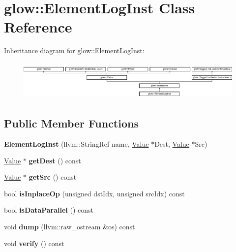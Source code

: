 \hypertarget{classglow_1_1_element_log_inst}{}\section{glow\+:\+:Element\+Log\+Inst Class Reference}
\label{classglow_1_1_element_log_inst}
Inheritance diagram for glow\+:\+:Element\+Log\+Inst\+:\begin{figure}[H]
\begin{center}
\leavevmode
\includegraphics[height=1.991111cm]{classglow_1_1_element_log_inst}
\end{center}
\end{figure}
\subsection*{Public Member Functions}
\begin{DoxyCompactItemize}
\item 
\mbox{\label{classglow_1_1_element_log_inst_a629b726abab98d5cee15cfb6927a898f}} 
{\bfseries Element\+Log\+Inst} (llvm\+::\+String\+Ref name, \hyperlink{classglow_1_1_value}{Value} $\ast$Dest, \hyperlink{classglow_1_1_value}{Value} $\ast$Src)
\item 
\mbox{\label{classglow_1_1_element_log_inst_a936528bc88434fdc9d9c92a4dd6e8d34}} 
\hyperlink{classglow_1_1_value}{Value} $\ast$ {\bfseries get\+Dest} () const
\item 
\mbox{\label{classglow_1_1_element_log_inst_a36c2c3371694006e2b24e709d9a6548b}} 
\hyperlink{classglow_1_1_value}{Value} $\ast$ {\bfseries get\+Src} () const
\item 
\mbox{\label{classglow_1_1_element_log_inst_acf62b48eb8394da1d902eaae96f21c01}} 
bool {\bfseries is\+Inplace\+Op} (unsigned dst\+Idx, unsigned src\+Idx) const
\item 
\mbox{\label{classglow_1_1_element_log_inst_ab400fee047625ff2d5e93e8a9ada9beb}} 
bool {\bfseries is\+Data\+Parallel} () const
\item 
\mbox{\label{classglow_1_1_element_log_inst_aa25bfb6ce4bdcdeb462389446170ff59}} 
void {\bfseries dump} (llvm\+::raw\+\_\+ostream \&os) const
\item 
\mbox{\label{classglow_1_1_element_log_inst_ab4e9dfe726078755a0e3f32a1d588613}} 
void {\bfseries verify} () const
\end{DoxyCompactItemize}
